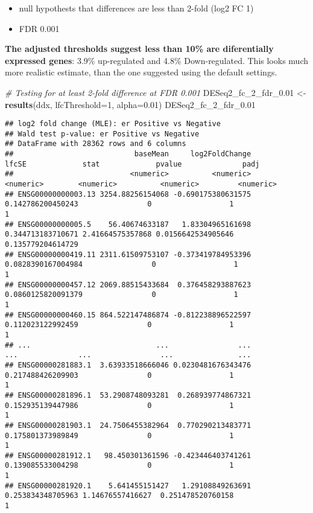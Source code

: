 \documentclass[]{book}
\newenvironment{Shaded}{\begin{snugshade}}{\end{snugshade}}
\newcommand{\KeywordTok}[1]{\textcolor[rgb]{0.13,0.29,0.53}{\textbf{#1}}}
\newcommand{\DataTypeTok}[1]{\textcolor[rgb]{0.13,0.29,0.53}{#1}}
\newcommand{\DecValTok}[1]{\textcolor[rgb]{0.00,0.00,0.81}{#1}}
\newcommand{\FloatTok}[1]{\textcolor[rgb]{0.00,0.00,0.81}{#1}}
\newcommand{\StringTok}[1]{\textcolor[rgb]{0.31,0.60,0.02}{#1}}
\newcommand{\CommentTok}[1]{\textcolor[rgb]{0.56,0.35,0.01}{\textit{#1}}}
\newcommand{\NormalTok}[1]{#1}
\providecommand{\tightlist}{%
  \setlength{\itemsep}{0pt}\setlength{\parskip}{0pt}}
\begin{document}
\begin{itemize}
\tightlist
\item
  null hypothests that differences are less than 2-fold (log2 FC 1)\\
\item
  FDR 0.001
\end{itemize}

\textbf{The adjusted thresholds suggest less than 10\% are diferentially
expressed genes}: 3.9\% up-regulated and 4.8\% Down-regulated. This
looks much more realistic estimate, than the one suggested using the
default settings.

\begin{Shaded}
\begin{Highlighting}[]
\CommentTok{# Testing for at least 2-fold difference at FDR 0.001}
\NormalTok{DESeq2_fc_2_fdr_}\FloatTok{0.01}\NormalTok{ <-}\StringTok{ }\KeywordTok{results}\NormalTok{(ddx, }\DataTypeTok{lfcThreshold=}\DecValTok{1}\NormalTok{, }\DataTypeTok{alpha=}\FloatTok{0.01}\NormalTok{)}
\NormalTok{DESeq2_fc_2_fdr_}\FloatTok{0.01}
\end{Highlighting}
\end{Shaded}

\begin{verbatim}
## log2 fold change (MLE): er Positive vs Negative 
## Wald test p-value: er Positive vs Negative 
## DataFrame with 28362 rows and 6 columns
##                            baseMean     log2FoldChange              lfcSE             stat             pvalue              padj
##                           <numeric>          <numeric>          <numeric>        <numeric>          <numeric>         <numeric>
## ENSG00000000003.13 3254.88256154068 -0.690175380631575  0.142786200450243                0                  1                 1
## ENSG00000000005.5    56.40674633187   1.83304965161698  0.344713183710671 2.41664575357868 0.0156642534905646 0.135779204614729
## ENSG00000000419.11 2311.61509753107 -0.373419784953396 0.0828390167004984                0                  1                 1
## ENSG00000000457.12 2069.88515433684  0.376458293887623 0.0860125820091379                0                  1                 1
## ENSG00000000460.15 864.522147486874 -0.812238896522597  0.112023122992459                0                  1                 1
## ...                             ...                ...                ...              ...                ...               ...
## ENSG00000281883.1  3.63933518666046 0.0230481676343476  0.217488426209903                0                  1                 1
## ENSG00000281896.1  53.2908748093281  0.268939774867321  0.152935139447986                0                  1                 1
## ENSG00000281903.1  24.7506455382964  0.770290213483771  0.175801373989849                0                  1                 1
## ENSG00000281912.1   98.450301361596 -0.423446403741261  0.139085533004298                0                  1                 1
## ENSG00000281920.1    5.641455151427   1.29108849263691  0.253834348705963 1.14676557416627  0.251478520760158                 1
\end{verbatim}
\end{document}
